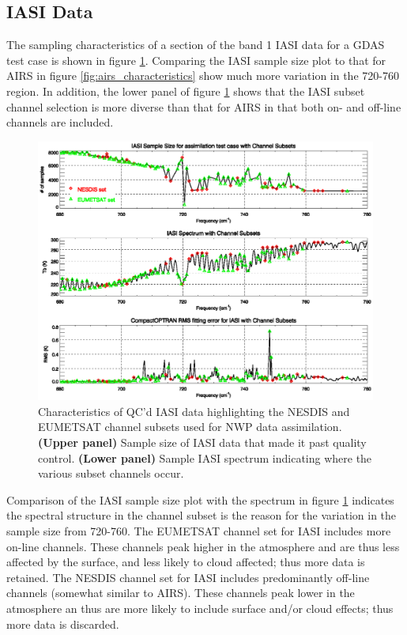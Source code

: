 \subsection{IASI Data}
The sampling characteristics of a section of the band 1 IASI data for a GDAS test case is shown in figure \ref{fig:iasi_characteristics}. Comparing the IASI sample size plot to that for AIRS in figure \ref{fig:airs_characteristics} show much more variation in the 720-760\invcm{} region. In addition, the lower panel of figure \ref{fig:iasi_characteristics} shows that the IASI subset channel selection is more diverse than that for AIRS in that both on- and off-line channels are included. 
\begin{figure}[htp]
  \centering
  \includegraphics[bb=70 340 540 571,clip,scale=0.8]{graphics/iasi_characteristics.eps}
  \caption{Characteristics of QC'd IASI data highlighting the NESDIS and EUMETSAT channel subsets used for NWP data assimilation. \textbf{(Upper panel)} Sample size of IASI data that made it past quality control. \textbf{(Lower panel)} Sample IASI spectrum indicating where the various subset channels occur.}
  \label{fig:iasi_characteristics}
\end{figure}
Comparison of the IASI sample size plot with the spectrum in figure \ref{fig:iasi_characteristics} indicates the spectral structure in the channel subset is the reason for the variation in the sample size from 720-760\invcm{}. The EUMETSAT channel set for IASI includes more on-line channels. These channels peak higher in the atmosphere and are thus less affected by the surface, and less likely to cloud affected; thus more data is retained. The NESDIS channel set for IASI includes predominantly off-line channels (somewhat similar to AIRS). These channels peak lower in the atmosphere an thus are more likely to include surface and/or cloud effects; thus more data is discarded.

